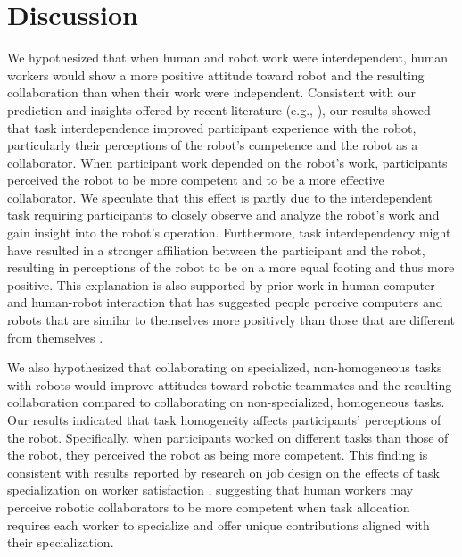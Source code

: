 \section{Discussion}
We hypothesized that when human and robot work were interdependent, human workers would show a more positive attitude toward robot and the resulting collaboration than when their work were independent. Consistent with our prediction and insights offered by recent literature (e.g., \cite{johnson2012autonomy}), our results showed that task interdependence improved participant experience with the robot, particularly their perceptions of the robot's competence and the robot as a collaborator. When participant work depended on the robot's work, participants perceived the robot to be more competent and to be a more effective collaborator. We speculate that this effect is partly due to the interdependent task requiring participants to closely observe and analyze the robot's work and gain insight into the robot's operation. Furthermore, task interdependency might have resulted in a stronger affiliation between the participant and the robot, resulting in perceptions of the robot to be on a more equal footing and thus more positive. This explanation is also supported by prior work in human-computer and human-robot interaction that has suggested people perceive computers and robots that are similar to themselves more positively than those that are different from themselves \cite{nass2000does,andrist2015look}.

We also hypothesized that collaborating on specialized, non-homogeneous tasks with robots would improve attitudes toward robotic teammates and the resulting collaboration compared to collaborating on non-specialized, homogeneous tasks. Our results indicated that task homogeneity affects participants' perceptions of the robot. Specifically, when participants worked on different tasks than those of the robot, they perceived the robot as being more competent. This finding is consistent with results reported by research on job design on the effects of task specialization on worker satisfaction \cite{hsieh2004reassessment}, suggesting that human workers may perceive robotic collaborators to be more competent when task allocation requires each worker to specialize and offer unique contributions aligned with their specialization.

